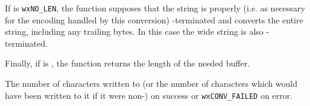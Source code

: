 If  is \texttt{wxNO\_LEN}, the function supposes that the string is
properly (i.e. as necessary for the encoding handled by this conversion) 
\NUL-terminated and converts the entire string, including any trailing \NUL 
bytes. In this case the wide string is also \NUL-terminated.

Finally, if  is \NULL, the function returns the length of the needed
buffer.


The number of characters written to  (or the number of characters
which would have been written to it if it were non-\NULL) on success or 
\texttt{wxCONV\_FAILED} on error.

